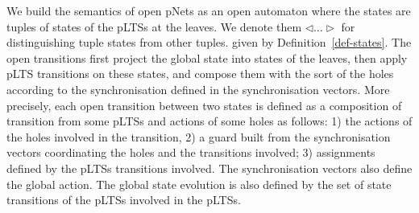 \documentclass{llncs}
\begin{document}
We build the semantics of open pNets as an open automaton where  the states are
tuples of states of the pLTSs at the leaves. We denote them $\triangleleft\ldots\triangleright$ for distinguishing tuple 
states from other tuples. given by 
Definition~\ref{def-states}. 
The open transitions first
 project the global state into states of the leaves, then apply
pLTS transitions on these states, and compose them with the sort of the holes according to the synchronisation defined in the synchronisation vectors. More precisely, each open transition between two states is defined as a composition of transition from some pLTSs and actions of some holes as follows: 1) the actions of the holes involved in the transition, 2) a guard  built from the synchronisation vectors coordinating the holes and the transitions involved; 3) assignments defined by the pLTSs transitions involved. The synchronisation vectors also define the global action. The global state evolution is also defined by the set of state transitions of the pLTSs involved in the pLTSs.
\end{document}
